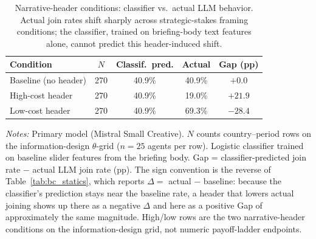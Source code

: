 \begin{table}[t]
\centering
\caption{Narrative-header conditions: classifier vs.\ actual LLM behavior. Actual join rates shift sharply across strategic-stakes framing conditions; the classifier, trained on briefing-body text features alone, cannot predict this header-induced shift.}
\label{tab:bc_classifier}
\footnotesize
\setlength{\tabcolsep}{4pt}
\begin{tabular}{lcccc}
\toprule
Condition & $N$ & Classif.\ pred. & Actual & Gap (pp) \\
\midrule
Baseline (no header) & 270 & 40.9\% & 40.9\% & $+0.0$ \\
High-cost header & 270 & 40.9\% & 19.0\% & $+21.9$ \\
Low-cost header & 270 & 40.9\% & 69.3\% & $-28.4$ \\
\bottomrule
\end{tabular}
\begin{tablenotes}
\footnotesize\emph{Notes:} Primary model (Mistral Small Creative). $N$ counts country--period rows on the information-design $\theta$-grid ($n = 25$ agents per row). Logistic classifier trained on baseline slider features from the briefing body. Gap = classifier-predicted join rate $-$ actual LLM join rate (pp). The sign convention is the reverse of Table~\ref{tab:bc_statics}, which reports $\Delta = $ actual $-$ baseline: because the classifier's prediction stays near the baseline rate, a header that lowers actual joining shows up there as a negative $\Delta$ and here as a positive Gap of approximately the same magnitude. High/low rows are the two narrative-header conditions on the information-design grid, not numeric payoff-ladder endpoints.
\end{tablenotes}
\end{table}
